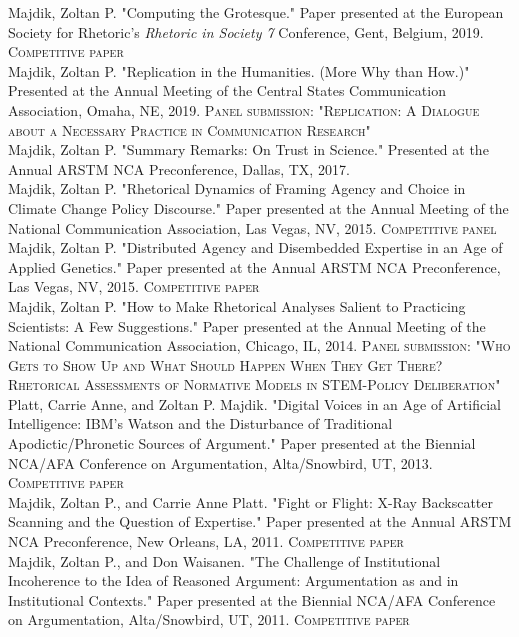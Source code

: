 \documentclass[10pt, a4paper]{article}
\newcommand{\years}[1]{\marginnote{\scriptsize #1}}
\begin{document}
\years{2019}Majdik, Zoltan P. "Computing the Grotesque." Paper presented at the
European Society for Rhetoric's \textit{Rhetoric in Society 7} Conference,
Gent, Belgium, 2019. \textsc{Competitive paper}\\
\years{2019}Majdik, Zoltan P. "Replication in the Humanities. (More Why than
How.)" Presented at the Annual Meeting of the Central States Communication
Association, Omaha, NE, 2019. \textsc{Panel submission: "Replication: A
Dialogue about a Necessary Practice in Communication Research"}\\
\years{2017}Majdik, Zoltan P. "Summary Remarks: On Trust in Science."
Presented at the Annual ARSTM NCA Preconference, Dallas, TX, 2017.\\
\years{2015}Majdik, Zoltan P. "Rhetorical Dynamics of Framing Agency and
Choice in Climate Change Policy Discourse." Paper presented at the Annual
Meeting of the National Communication Association, Las Vegas, NV, 2015. \textsc{Competitive
panel}\\
\years{2015}Majdik, Zoltan P. "Distributed Agency and Disembedded
Expertise in an Age of Applied Genetics." Paper presented at the Annual ARSTM NCA
Preconference, Las Vegas, NV, 2015.
\textsc{Competitive paper}\\
\years{2014}Majdik, Zoltan P. "How to Make Rhetorical Analyses Salient to
Practicing Scientists: A Few Suggestions." Paper presented at the Annual
Meeting of the National Communication Association, Chicago, IL, 2014. \textsc{Panel
submission: "Who Gets to Show Up and What Should Happen When They Get There?
Rhetorical Assessments of Normative Models in STEM-Policy Deliberation"}\\
\years{2013}Platt, Carrie Anne, and Zoltan P. Majdik. "Digital Voices in
an Age of Artificial Intelligence: IBM's Watson and the Disturbance of
Traditional Apodictic/Phronetic Sources of Argument." Paper presented at the
Biennial NCA/AFA Conference on Argumentation, Alta/Snowbird, UT, 2013. \textsc{Competitive
paper}\\
\years{2011}Majdik, Zoltan P., and Carrie Anne Platt. "Fight or Flight:
X-Ray Backscatter Scanning and the Question of Expertise." Paper presented at
the Annual ARSTM NCA Preconference, New Orleans, LA, 2011. \textsc{Competitive paper}\\
\years{2011}Majdik, Zoltan P., and Don Waisanen. "The Challenge of
Institutional Incoherence to the Idea of Reasoned Argument: Argumentation as
and in Institutional Contexts." Paper presented at the Biennial NCA/AFA
Conference on Argumentation, Alta/Snowbird, UT, 2011. \textsc{Competitive paper}\\
\end{document}
